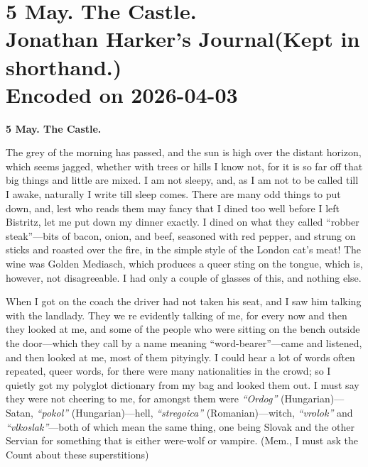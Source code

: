 \documentclass{article}
\begin{document}
				
				\section[5 May. The Castle. --- Jonathan Harker's Journal]{{\huge 5 May. The Castle. \\ Jonathan Harker's Journal\newline (Kept in shorthand.)}\\ Encoded on 2026-04-03}\par\bigskip\noindent 
			
			
			
				\noindent\textbf{5 May. The Castle.}\par\medskip
				
				The grey of the morning has passed, and the sun is high over the distant horizon, which seems jagged, whether with trees or hills I know not, for it is so far off that big things and little are mixed. I am not sleepy, and, as I am not to be called till I awake, naturally I write till sleep comes. There are many odd things to put down, and, lest who reads them may fancy that I dined too well before I left Bistritz, let me put down my dinner exactly. I dined on what they called “robber steak”—bits of bacon, onion, and beef, seasoned with red pepper, and strung on sticks and roasted over the fire, in the simple style of the London cat’s meat! The wine was Golden Mediasch, which produces a queer sting on the tongue, which is, however, not disagreeable. I had only a couple of glasses of this, and nothing else.\par\bigskip
				
				When I got on the coach the driver had not taken his seat, and I saw him talking with the landlady. They we
					re evidently talking of me, for every now and then they looked at me, and some of the people who were sitting on the bench outside the door—which they call by a name meaning “word-bearer”—came and listened, and then looked at me, most of them pityingly. I could hear a lot of words often repeated, queer words, for there were many nationalities in the crowd; so I quietly got my polyglot dictionary from my bag and looked them out. I must say they were not cheering to me, for amongst them were \textit{“Ordog”} (Hungarian)—Satan, \textit{“pokol”} (Hungarian)—hell, \textit{“stregoica”} (Romanian)—witch, \textit{“vrolok”} and \textit{“vlkoslak”}—both of which mean the same thing, one being Slovak and the other Servian for something that is either were-wolf or vampire. (Mem., I must ask the Count about these superstitions)\par\bigskip
				
\end{document}
